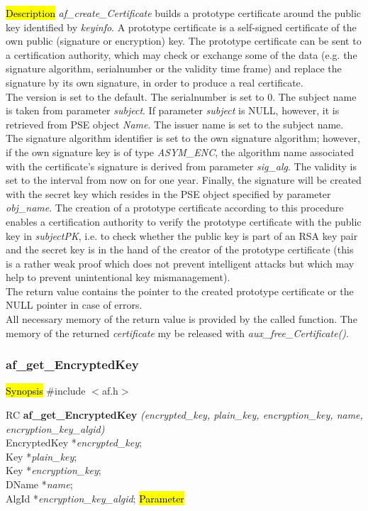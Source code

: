 \hl{Description}
{\em af\_create\_Certificate} builds a prototype certificate around the
public key identified by {\em keyinfo}. A prototype certificate is a self-signed
certificate of the own public (signature or encryption) key. The 
prototype certificate can be sent to a certification authority, which may check
or exchange some of the data (e.g. the signature algorithm, serialnumber or the validity time frame)
and replace the signature by its own signature, in order to produce a real certificate.
\\ [1em]
The version is set to the default. The serialnumber is set to $0$.
The subject name is taken from parameter {\em subject}. If parameter {\em subject} is NULL, however, it is 
retrieved from PSE object {\em Name}. The issuer name is set to the subject name.
The signature algorithm identifier is set to the
own signature algorithm; however, if the own signature 
key is of type {\em ASYM\_ENC}, the algorithm name associated with the certificate's signature is derived
from parameter {\em sig\_alg}. The validity is set to the interval
from now on for one year. Finally, the signature will be created
with the secret key which resides in the PSE object specified by parameter {\em obj\_name}.
The creation of a prototype certificate according to this procedure enables a
certification authority to verify the prototype certificate with
the public key in {\em subjectPK}, i.e. to check whether the public
key is part of an RSA key pair and the secret key is in the hand of the
creator of the prototype certificate (this is a rather weak proof
which does not prevent intelligent attacks but which may help to prevent
unintentional key mismanagement).
\\ [1em]
The return value contains the pointer to the created prototype certificate or
the NULL pointer in case of errors.
\\ [1em]
All necessary memory of the return value is provided by the called function.
The memory of the returned {\em certificate} my be released with 
{\em aux\_free\_Certificate()}.


\subsubsection{af\_get\_EncryptedKey}
\label{af_get_EncryptedKey}
\hl{Synopsis}
\#include $<$af.h$>$

RC {\bf af\_get\_EncryptedKey} {\em (encrypted\_key, plain\_key, encryption\_key, name, encryption\_key\_algid)} \\
EncryptedKey *{\em encrypted\_key}; \\
Key *{\em plain\_key}; \\
Key *{\em encryption\_key}; \\
DName *{\em name}; \\
AlgId *{\em encryption\_key\_algid};
\hl{Parameter}

